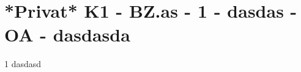 \section{*Privat* K1 - BZ.as - 1 - dasdas - OA - dasdasda}

\begin{langesbeispiel} \item[1] %
dasdasd
\end{langesbeispiel}